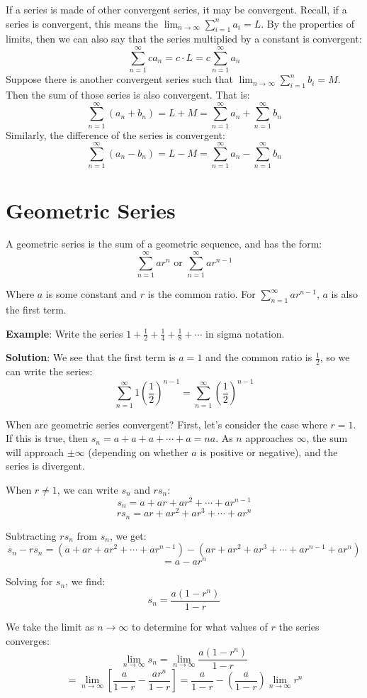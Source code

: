 If a series is made of other convergent series, it may be convergent. Recall, 
if a series is convergent, this means the $\lim_{n \to \infty} \sum_{i=1}^n 
a_i = L$. By the properties of limits, then we can also say that the series 
multiplied by a constant is convergent:
$$\sum_{n=1}^\infty ca_n = c \cdot L = c \sum_{n=1}^\infty a_n$$
Suppose there is another convergent series such that $\lim_{n \to \infty} 
\sum_{i=1}^n b_i = M$. Then the sum of those series is also convergent. That is:
$$\sum_{n=1}^\infty \left( a_n + b_n \right) = L + M = \sum_{n=1}^\infty a_n + 
\sum_{n=1}^\infty b_n$$
Similarly, the difference of the series is convergent:
$$\sum_{n=1}^\infty \left( a_n - b_n \right) = L - M = \sum_{n=1}^\infty a_n - 
\sum_{n=1}^\infty b_n$$

\section{Geometric Series}

A geometric series is the sum of a geometric sequence, and has the form:
$$\sum_{n=1}^\infty ar^n \text{ or } \sum_{n=1}^\infty ar^{n-1}$$ 

Where $a$ is some constant and $r$ is the common ratio. For $\sum_{n=1}^\infty 
ar^{n-1}$, $a$ is also the first term. 

\textbf{Example}: Write the series $1 + \frac{1}{2} + \frac{1}{4} + 
\frac{1}{8} + \cdots$ in sigma notation.

\textbf{Solution}: We see that the first term is $a=1$ and the common ratio is 
$\frac{1}{2}$, so we can write the series: $$\sum_{n=1}^\infty 1(\frac{1}{2})^
{n-1} = \sum_{n=1}^\infty (\frac{1}{2})^{n-1}$$

When are geometric series convergent? First, let's consider the case 
where $r=1$. If this is true, then $s_n = a + a + a + \cdots + a = 
na$. As $n$ approaches $\infty$, the sum will approach $\pm \infty$ 
(depending on whether $a$ is positive or negative), and the series is 
divergent. 

When $r \neq 1$, we can write $s_n$ and $rs_n$:
$$s_n = a + ar + ar^2 + \cdots + ar^{n-1}$$
$$rs_n = ar + ar^2 + ar^3 + \cdots + ar^n$$

Subtracting $rs_n$ from $s_n$, we get:
$$s_n - rs_n = (a + ar + ar^2 + \cdots + ar^{n-1}) - (ar + ar^2 + 
ar^3 + \cdots + ar^{n-1} + ar^n)$$
$$= a - ar^n$$

Solving for $s_n$, we find:
$$s_n = \frac{a(1-r^n)}{1-r}$$

We take the limit as $n \to \infty$ to determine for what values of 
$r$ the series converges:
$$\lim_{n \to \infty} s_n = \lim_{n \to \infty} \frac{a(1-r^n)}{1-r}$$
$$= \lim_{n\to \infty} \left[ \frac{a}{1-r} - \frac{ar^n}{1-r} \right] = \frac{a}{1-r} 
- \left( \frac{a}{1-r} \right) \lim_{n \to \infty} r^n$$

